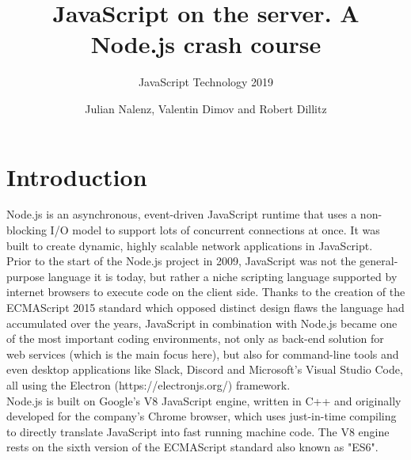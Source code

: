 \documentclass{bioinfo}
\begin{document}

\subtitle{JavaScript Technology 2019}

\title[short Title]{JavaScript on the server. A Node.js crash course}
\author{Julian Nalenz, Valentin Dimov and Robert Dillitz}


\maketitle

\section{Introduction}

Node.js is an asynchronous, event-driven JavaScript runtime that uses a non-blocking I/O model to support lots of concurrent connections at once. It was built to create dynamic, highly scalable network applications in JavaScript.\\ Prior to the start of the Node.js project in 2009, JavaScript was not the general-purpose language it is today, but rather a niche scripting language supported by internet browsers to execute code on the client side. Thanks to the creation of the ECMAScript 2015 standard which opposed distinct design flaws the language had accumulated over the years, JavaScript in combination with Node.js became one of the most important coding environments, not only as back-end solution for web services (which is the main focus here), but also for command-line tools and even desktop applications like Slack, Discord and Microsoft's Visual Studio Code, all using the Electron (https://electronjs.org/) framework.\\
Node.js is built on Google's V8 JavaScript engine, written in C++ and originally developed for the company's Chrome browser, which uses just-in-time compiling to directly translate JavaScript into fast running machine code. The V8 engine rests on the sixth version of the ECMAScript standard also known as "ES6".
\end{document}
